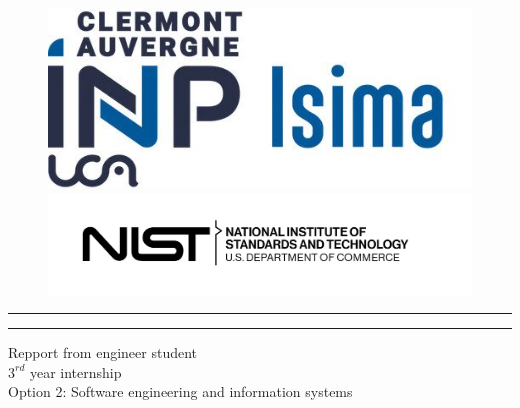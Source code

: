
\begin{titlepage}
  \rmfamily{}

  \hspace{\fill}
  \begin{figure}[!htb]
     \begin{minipage}{0.50\textwidth}
       \centering
       \includegraphics[width=0.8\linewidth]{logos/isima.jpeg}
     \end{minipage}\hfill
     \begin{minipage}{0.50\textwidth}
       \centering
       \includegraphics[width=1.2\linewidth]{logos/nist-logo.png}%
     \end{minipage}
     \label{titelfig:logos}
  \end{figure}
  \vspace*{1cm}

  \begin{center}
    \begin{Large}
    \par\noindent\rule{\textwidth}{0.5pt}
    \Huge
    \textbf{\paperTitle}
    \par\noindent\rule{\textwidth}{0.5pt}
    \vspace{0.2cm}
    \LARGE
    Repport from engineer student\\
    $3^{rd}$ year internship\\
    Option 2: Software engineering and information systems
    \end{Large}


\end{center}
\end{titlepage}
